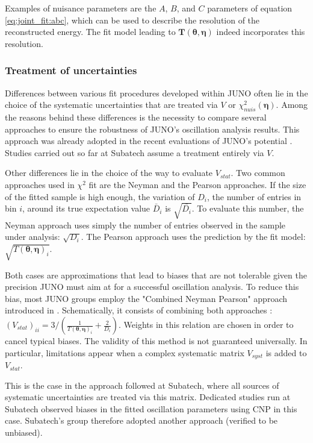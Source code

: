 \documentclass[../main.tex]{subfiles}
\begin{document}
Examples of nuisance parameters are the $A$, $B$, and $C$ parameters of equation \ref{eq:joint_fit:abc}, which can be used to describe the resolution of the reconstructed energy. The fit model leading to $\bm{T}\left(\bm{\theta},\bm{\eta}\right)$ indeed incorporates this resolution.

\subsubsection{Treatment of uncertainties}

Differences between various fit procedures developed within JUNO often lie in the choice of the systematic uncertainties that are treated via $V$ or $\chi^2_{nuis}(\bm{\eta})$. Among the reasons behind these differences is the necessity to compare several approaches to ensure the robustness of JUNO's oscillation analysis results. This approach was already adopted in the recent evaluations of JUNO's potential \cite{abusleme_potential_2024, juno_collaboration_sub-percent_2022}. Studies carried out so far at Subatech assume a treatment entirely via $V$.

Other differences lie in the choice of the way to evaluate $V_{stat}$. Two common approaches used in $\chi^2$ fit are the Neyman and the Pearson approaches. If the size of the fitted sample is high enough, the variation of $D_i$, the number of entries in bin $i$, around its true expectation value $\bar{D}_i$ is $\sqrt{\bar{D_i}}$. To evaluate this number, the Neyman approach uses simply the number of entries observed in the sample under analysis: $\sqrt{D_i}$. The Pearson approach uses the prediction by the fit model: $\sqrt{T(\bm{\theta},\bm{\eta})_i}$.

Both cases are approximations that lead to biases that are not tolerable given the precision JUNO must aim at for a successful oscillation analysis. To reduce this bias, most JUNO groups employ the "Combined Neyman Pearson" approach introduced in \cite{ji_combined_2019}. Schematically, it consists of combining both approaches :
$\left(V_{stat}\right)_{ii} = 3/\left(\frac{1}{T(\bm{\theta},\bm{\eta})_i}+\frac{2}{D_i}\right)$.
Weights in this relation are chosen in order to cancel typical biases. The validity of this method is not guaranteed universally. In particular, limitations appear when a complex systematic matrix $V_{syst}$ is added to $V_{stat}$.

This is the case in the approach followed at Subatech, where all sources of systematic uncertainties are treated via this matrix. Dedicated studies run at Subatech observed biases in the fitted oscillation parameters using CNP in this case. Subatech's group therefore adopted another approach (verified to be unbiased).
\end{document}
